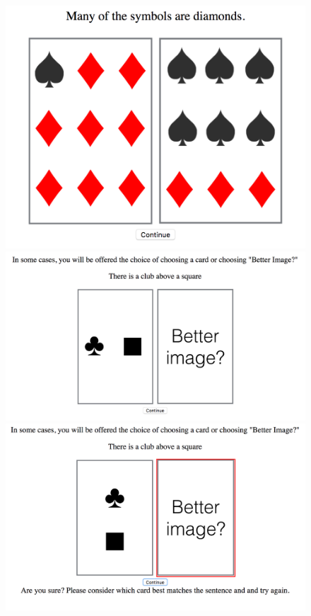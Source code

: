 \documentclass[]{article}
\begin{document}
\begin{figure}[h]

\centering
\begin{minipage}[b]{0.3\textwidth}
\includegraphics[width=\textwidth]{example1.png} 
\end{minipage}
\begin{minipage}[b]{0.3\textwidth}
\includegraphics[width=\textwidth]{example2.png} 
\end{minipage}
\begin{minipage}[b]{0.3\textwidth}
\includegraphics[width=\textwidth]{example3.png} 
\end{minipage}
\end{figure}
\pagebreak
\end{document}
